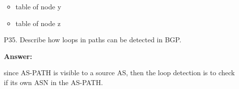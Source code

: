 \begin{enumerate}
\begin{itemize}
        \item table of node y
        \begin{table}[H]
            \centering
            \qquad
        \end{table}

        \item table of node z
        \begin{table}[H]
            \centering
            \qquad
        \end{table}
    \end{itemize}

    \item[P35.] Describe how loops in paths can be detected in BGP.

    \textbf{Answer:}

    since AS-PATH is visible to a source AS, then the loop detection is to check if its own ASN in the AS-PATH.
\end{enumerate}


